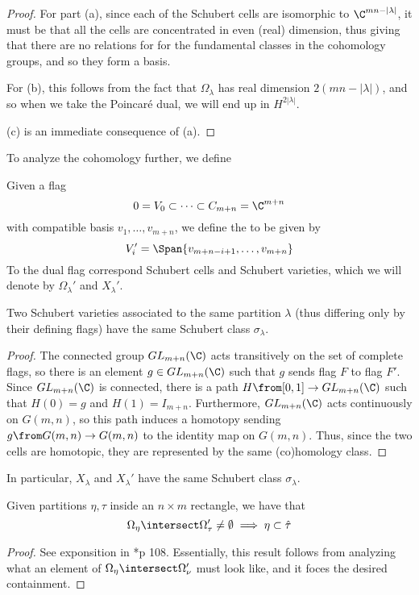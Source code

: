 \documentclass[11pt,leqno,oneside]{amsart}
\numberwithin{thm}{section}
\begin{document}
\begin{proof}
  For part (a), since each of the Schubert cells are isomorphic to
  \(\C^{mn-|\lambda|}\), it must be that all the cells are
  concentrated in even (real) dimension, thus giving that there are no
  relations for for the fundamental classes in the cohomology groups,
  and so they form a basis.

  For (b), this follows from the fact that \(\Omega_\lambda\) has real
  dimension \(2(mn-|\lambda|)\), and so when we take the Poincar\'{e}
  dual, we will end up in \(H^{2|\lambda|}\).

  (c) is an immediate consequence of (a).
\end{proof}
To analyze the cohomology further, we define
\begin{defn}
  Given a flag \[
    0 = V_0 \subset \cdots \subset C_{m+n} = \C^{m+n}
  \]
  with compatible basis \(v_1, \ldots, v_{m+n}\), we define the
   to be given by \[
    V_i' = \Span\{v_{m+n-i+1}, \ldots, v_{m+n}\}
  \]
  To the dual flag correspond Schubert cells and Schubert varieties,
  which we will denote by \(\Omega_\lambda'\) and \(X_\lambda'\).
\end{defn}
\begin{prop}
  Two Schubert varieties associated to the same partition \(\lambda\)
  (thus differing only by their defining flags)
  have the 
  same Schubert class \(\sigma_\lambda\).
\end{prop}
\begin{proof}
  The connected group \(GL_{m+n}(\C)\) acts transitively on the set of
  complete flags, so there is an element \(g \in GL_{m+n}(\C)\) such
  that \(g\) sends flag \(F\) to flag \(F'\). Since \(GL_{m+n}(\C)\)
  is connected,  there is a path \(H \from [0,1] \to GL_{m+n}(\C)\)
  such that \(H(0) = g\) and \(H(1) = I_{m+n}\).  Furthermore,
  \(GL_{m+n}(\C)\) acts continuously on 
  \(G(m,n)\), so this path induces a homotopy sending \(g \from G(m,n)
  \to G(m,n)\) to the identity map on \(G(m,n)\). Thus, since the two
  cells are homotopic, they are represented by the same (co)homology
  class. 
\end{proof} 
In particular, \(X_\lambda\) and \(X_\lambda'\) have the same
Schubert class \(\sigma_\lambda\).
\begin{lem}
  Given partitions \(\eta, \tau\) inside an \(n \times m\) rectangle,
  we have that \[
    \Omega_\eta \intersect \Omega_\tau' \neq \emptyset \implies \eta
    \subset \hat{\tau}
  \]
\end{lem}
\begin{proof}
  See exponsition in \cite{manivel}*{p 108}. Essentially, this result
  follows from analyzing what an element of \(\Omega_\eta \intersect
  \Omega_\nu'\) must look like, and it foces the desired containment.
\end{proof}
\end{document}

